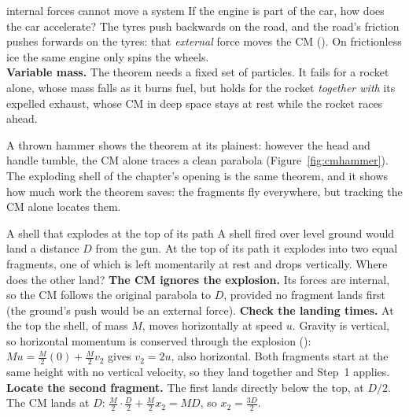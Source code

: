 \begin{trapbox}{internal forces cannot move a system}
If the engine is part of the car, how does the car accelerate? The tyres push backwards on the road, and
the road's friction pushes forwards on the tyres: that \emph{external} force moves the CM ().
On frictionless ice the same engine only spins the wheels.\\[3pt]
\textbf{Variable mass.} The theorem needs a fixed set of particles. It fails for a rocket alone, whose mass
falls as it burns fuel, but holds for the rocket \emph{together with} its expelled exhaust, whose CM in deep
space stays at rest while the rocket races ahead.
\end{trapbox}

\begin{figure}[htbp]
\centering
{}
\end{figure}

A thrown hammer shows the theorem at its plainest: however the head and handle tumble, the CM alone
traces a clean parabola (Figure~\ref{fig:cmhammer}). The exploding shell of the chapter's opening is the same theorem, and it shows how much work the theorem
saves: the fragments fly everywhere, but tracking the CM alone locates them.

\begin{exbox}{A shell that explodes at the top of its path}\label{ex:explode13}
A shell fired over level ground would land a distance $D$ from the gun. At the top of its path it explodes
into two equal fragments, one of which is left momentarily at rest and drops vertically. Where does the
other land?
 \textbf{The CM ignores the explosion.} Its forces are internal, so the CM follows the original
parabola to $D$, provided no fragment lands first (the ground's push would be an external force).
 \textbf{Check the landing times.} At the top the shell, of mass $M$, moves horizontally at speed
$u$. Gravity is vertical, so horizontal momentum is conserved through the explosion ():
$Mu=\tfrac{M}{2}(0)+\tfrac{M}{2}v_2$ gives $v_2=2u$, also horizontal. Both fragments start
at the same height with no vertical velocity, so they land together and Step~1 applies.
 \textbf{Locate the second fragment.} The first lands directly below the top, at $D/2$. The CM
lands at $D$: $\tfrac{M}{2}\cdot\tfrac{D}{2}+\tfrac{M}{2}x_2=MD$, so $x_2=\tfrac{3D}{2}$.
\end{exbox}

